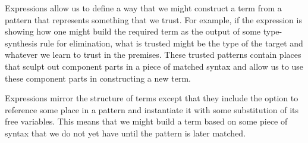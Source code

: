 
Expressions allow us to define a way that we might construct a term from a
pattern that represents something that we trust. For example, if the expression
is showing how one might build the required term as the output of some
type-synthesis rule for elimination, what is trusted might be the type of the
target and whatever we learn to trust in the premises. These trusted patterns
contain places that sculpt out component parts in a piece of matched syntax
and allow us to use these component parts in constructing a new term.

Expressions mirror the structure of terms except that they include the option
to reference some place in a pattern and instantiate it with some substitution
of its free variables. This means that we might build a term based on some
piece of syntax that we do not yet have until the pattern is later matched.

